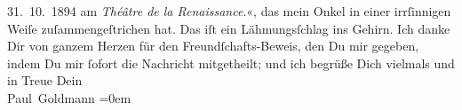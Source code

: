 \begin{ledgroupsized}[t]{13cm}
{{{                     31. 10. 1894 am \emph{Théâtre de la
                     Renaissance}.}}}\label{K_L02618-111h}«, das mein Onkel in einer irrſinnigen Weiſe zuſammengeſtrichen hat.
               Das iſt ein Lähmungsſchlag ins Gehirn.\pend
           \pstart
           Ich danke Dir von ganzem Herzen für den Freundſchafts-Beweis, den Du mir gegeben,
               indem Du mir ſofort die {\pb}Nachricht mitgetheilt; und
               ich begrüße Dich vielmals und in Treue\pend
           \pstart
           Dein {\\[\baselineskip]}\spacefill\mbox{Paul Goldmann}\pend
           \leftskip=0em{}
         
         \endnumbering{}\end{ledgroupsized}  \newcommand{\dateiname}{L02618}\newcommand{\titel}{Paul Goldmann an Arthur Schnitzler, 3. 11. [1894]}\newcommand{\editorInnen}{Martin Anton Müller und Laura Untner}
      
